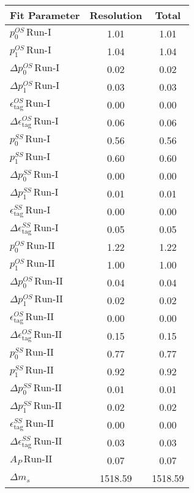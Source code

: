 \begin{tabular}{l  c  | c }
\hline
\hline
Fit Parameter & Resolution &  Total  \\ 
\hline
$p_{0}^{OS} \, \text{Run-I}$ & 1.01 & 1.01 \\ 
$p_{1}^{OS} \, \text{Run-I}$ & 1.04 & 1.04 \\ 
$\Delta p_{0}^{OS} \, \text{Run-I}$ & 0.02 & 0.02 \\ 
$\Delta p_{1}^{OS} \, \text{Run-I}$ & 0.03 & 0.03 \\ 
$\epsilon_{\text{tag}}^{OS} \, \text{Run-I}$ & 0.00 & 0.00 \\ 
$\Delta \epsilon_{\text{tag}}^{OS} \, \text{Run-I}$ & 0.06 & 0.06 \\ 
$p_{0}^{SS} \, \text{Run-I}$ & 0.56 & 0.56 \\ 
$p_{1}^{SS} \, \text{Run-I}$ & 0.60 & 0.60 \\ 
$\Delta p_{0}^{SS} \, \text{Run-I}$ & 0.00 & 0.00 \\ 
$\Delta p_{1}^{SS} \, \text{Run-I}$ & 0.01 & 0.01 \\ 
$\epsilon_{\text{tag}}^{SS} \, \text{Run-I}$ & 0.00 & 0.00 \\ 
$\Delta \epsilon_{\text{tag}}^{SS} \, \text{Run-I}$ & 0.05 & 0.05 \\ 
$p_{0}^{OS} \, \text{Run-II}$ & 1.22 & 1.22 \\ 
$p_{1}^{OS} \, \text{Run-II}$ & 1.00 & 1.00 \\ 
$\Delta p_{0}^{OS} \, \text{Run-II}$ & 0.04 & 0.04 \\ 
$\Delta p_{1}^{OS} \, \text{Run-II}$ & 0.02 & 0.02 \\ 
$\epsilon_{\text{tag}}^{OS} \, \text{Run-II}$ & 0.00 & 0.00 \\ 
$\Delta \epsilon_{\text{tag}}^{OS} \, \text{Run-II}$ & 0.15 & 0.15 \\ 
$p_{0}^{SS} \, \text{Run-II}$ & 0.77 & 0.77 \\ 
$p_{1}^{SS} \, \text{Run-II}$ & 0.92 & 0.92 \\ 
$\Delta p_{0}^{SS} \, \text{Run-II}$ & 0.01 & 0.01 \\ 
$\Delta p_{1}^{SS} \, \text{Run-II}$ & 0.02 & 0.02 \\ 
$\epsilon_{\text{tag}}^{SS} \, \text{Run-II}$ & 0.00 & 0.00 \\ 
$\Delta \epsilon_{\text{tag}}^{SS} \, \text{Run-II}$ & 0.03 & 0.03 \\ 
$A_{P} \, \text{Run-II}$ & 0.07 & 0.07 \\ 
$\Delta m_{s}$ & 1518.59 & 1518.59 \\ 
\hline
\hline
\end{tabular}
